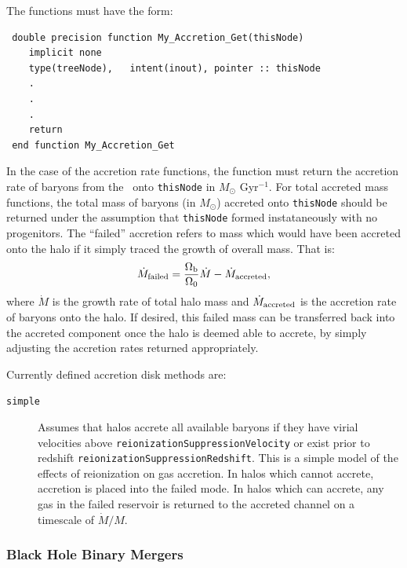 The functions must have the form:
\begin{verbatim}
 double precision function My_Accretion_Get(thisNode)
    implicit none
    type(treeNode),   intent(inout), pointer :: thisNode
    .
    .
    .
    return
 end function My_Accretion_Get
\end{verbatim}
In the case of the accretion rate functions, the function must return the accretion rate of baryons from the \IGM\ onto {\tt thisNode} in $M_\odot$ Gyr$^{-1}$. For total accreted mass functions, the total mass of baryons (in $M_\odot$) accreted onto {\tt thisNode} should be returned under the assumption that {\tt thisNode} formed instataneously with no progenitors. The ``failed'' accretion refers to mass which would have been accreted onto the halo if it simply traced the growth of overall mass. That is:
\begin{equation}
 \dot{M}_{\rm failed} = {\Omega_{\rm b} \over \Omega_0} \dot{M} - \dot{M}_{\rm accreted},
\end{equation}
where $\dot{M}$ is the growth rate of total halo mass and $\dot{M}_{\rm accreted}$ is the accretion rate of baryons onto the halo. If desired, this failed mass can be transferred back into the accreted component once the halo is deemed able to accrete, by simply adjusting the accretion rates returned appropriately.

Currently defined accretion disk methods are:
\begin{description}
 \item [{\tt simple}] Assumes that halos accrete all available baryons if they have virial velocities above {\tt reionizationSuppressionVelocity} or exist prior to redshift {\tt reionizationSuppressionRedshift}. This is a simple model of the effects of reionization on gas accretion. In halos which cannot accrete, accretion is placed into the failed mode. In halos which can accrete, any gas in the failed reservoir is returned to the accreted channel on a timescale of $\dot{M}/M$.
\end{description}

\subsubsection{Black Hole Binary Mergers}\label{sec:BlackHoleBinaryMergers}

